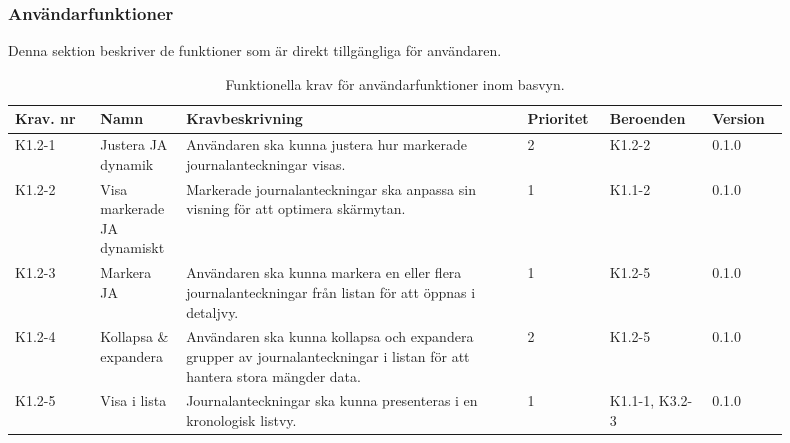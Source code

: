\documentclass{article}
\begin{document}
\subsubsection{Användarfunktioner}
Denna sektion beskriver de funktioner som är direkt tillgängliga för användaren.

\begin{table}[H]
    \caption{Funktionella krav för användarfunktioner inom basvyn.} 
    \label{tab:användar_funktioner}
    \centering
    \begin{tabular}{|p{0.1\linewidth}|p{0.1\linewidth}|p{0.4\linewidth}|p{0.09\linewidth}|p{0.12\linewidth}|p{0.09\linewidth}|}
        \hline
        \textbf{Krav. nr} & \textbf{Namn} & \textbf{Kravbeskrivning} & \textbf{Prioritet} & \textbf{Beroenden}  & \textbf{Version} \\ \hline
        K1.2-1 & Justera JA dynamik & Användaren ska kunna justera hur markerade journalanteckningar visas. & 2 & K1.2-2 & 0.1.0\\ \hline
        K1.2-2 & Visa markerade JA dynamiskt & Markerade journalanteckningar ska anpassa sin visning för att optimera skärmytan. & 1 & K1.1-2 & 0.1.0\\ \hline
        K1.2-3 & Markera JA & Användaren ska kunna markera en eller flera journalanteckningar från listan för att öppnas i detaljvy. & 1 & K1.2-5 & 0.1.0\\ \hline
        K1.2-4 & Kollapsa \& expandera & Användaren ska kunna kollapsa och expandera grupper av journalanteckningar i listan för att hantera stora mängder data. & 2 & K1.2-5 & 0.1.0\\ \hline
        K1.2-5 & Visa i lista & Journalanteckningar ska kunna presenteras i en kronologisk listvy. & 1 & K1.1-1, K3.2-3 & 0.1.0\\ \hline
    \end{tabular}
\end{table}
\end{document}
